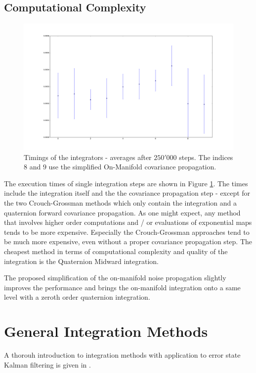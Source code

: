 \documentclass[10pt,a4paper]{article}
\numberwithin{equation}{section}
\begin{document}
\subsection{Computational Complexity}

\begin{figure}
\includegraphics[width=14cm]{figures/integrator_timings.pdf}
\caption{Timings of the integrators - averages after $250'000$ steps. The indices $8$ and $9$ use the simplified On-Manifold covariance propagation.}
\label{fig:integration_timings}
\end{figure}	

The execution times of single integration steps are shown in Figure \ref{fig:integration_timings}. The times include the integration itself and the the covariance propagation step - except for the two Crouch-Grossman methods which only contain the integration and a quaternion forward covariance propagation.
As one might expect, any method that involves higher order computations and / or evaluations of exponential maps tends to be more expensive. Especially the Crouch-Grossman approaches tend to be much more expensive, even without a proper covariance propagation step. The cheapest method in terms of computational complexity and quality of the integration is the Quaternion Midward integration.

The proposed simplification of the on-manifold noise propagation slightly improves the performance and brings the on-manifold integration onto a same level with a zeroth order quaternion integration.

\section{General Integration Methods}
A thorouh introduction to integration methods with application to error state Kalman filtering is given in \cite{joan_sola}.
\end{document}
